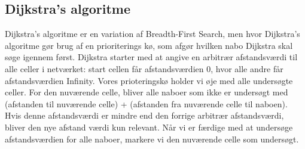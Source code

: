 \documentclass[12pt]{article}
\begin{document}
\subsection{Dijkstra’s algoritme}
Dijkstra’s algoritme er en variation af Breadth-First Search, men hvor Dijkstra’s algoritme gør brug af en prioriterings kø, som afgør hvilken nabo Dijkstra skal søge igennem først. 
Dijkstra starter med at angive en arbitrær afstandsværdi til alle celler i netværket: start cellen får afstandsværdien 0, hvor alle andre får afstandsværdien Infinity. 
Vores prioteringskø holder vi øje med alle undersøgte celler. For den nuværende celle, bliver alle naboer som ikke er undersøgt med (afstanden til nuværende celle) + (afstanden fra nuværende celle til naboen). Hvis denne afstandsværdi er mindre end den forrige arbitrær afstandsværdi, bliver den nye afstand værdi kun relevant. Når vi er færdige med at undersøge afstandsværdien for alle naboer, markere vi den nuværende celle som undersøgt.  
\end{document}
